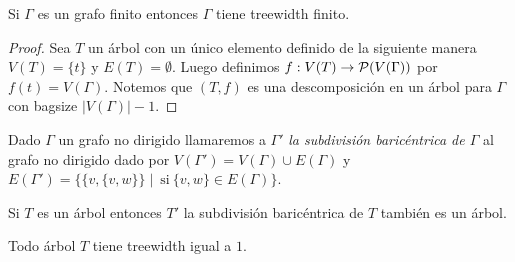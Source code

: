 \documentclass[tesis.tex]{subfiles}
\begin{document}
\begin{lema}
	Si $\Gamma$ es un grafo finito entonces $\Gamma$ tiene treewidth finito. 
\end{lema}
\begin{proof}
	Sea $T$ un árbol con un único elemento definido de la siguiente manera $V(T) = \{ t \}$ y $E(T) = \emptyset$.
	Luego definimos $f: V(T) \to {\cal{P}}(V(\Gamma))$ por $f(t) = V(\Gamma)$.
	Notemos que $(T,f)$ es una descomposición en un árbol para $\Gamma$ con bagsize $|V(\Gamma)| - 1$.	
\end{proof}


\begin{deff}
	Dado $\Gamma$ un grafo no dirigido llamaremos a $\Gamma'$ \emph{la subdivisión baricéntrica de $\Gamma$ }al grafo no dirigido dado por
	$V(\Gamma') = V(\Gamma) \cup E(\Gamma)$ y $E(\Gamma') = \{ \{ v, \{v,w \} \} \mid \ \text{si} \ \{ v,w \} \in E(\Gamma) \}$.
\end{deff}




\begin{obs}\label{obs_sub_bari_arbol}
	Si $T$ es un árbol entonces $T'$ la subdivisión baricéntrica de $T$ también es un árbol.
\end{obs}

\begin{prop}\label{desc-arbol-arbol}
	Todo árbol $T$ tiene treewidth igual a  $1$.
\end{prop}
\end{document}

